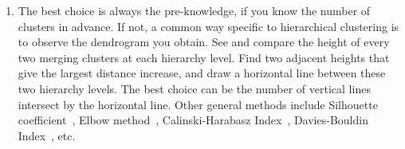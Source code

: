 \begin{enumerate}
\item The best choice is always the pre-knowledge, if you know the number of clusters in advance. If not, a common way specific to hierarchical clustering is to observe the dendrogram you obtain. See and compare the height of every two merging clusters at each hierarchy level. Find two adjacent heights that give the largest distance increase, and draw a horizontal line between these two hierarchy levels. The best choice can be the number of vertical lines intersect by the horizontal line. Other general methods include Silhouette coefficient~\cite{Wiki2022a}, Elbow method~\cite{Baruah2020}, Calinski-Harabasz Index~\cite{Baruah2020}, Davies-Bouldin Index~\cite{Wiki2022b}, etc.
\end{enumerate}



